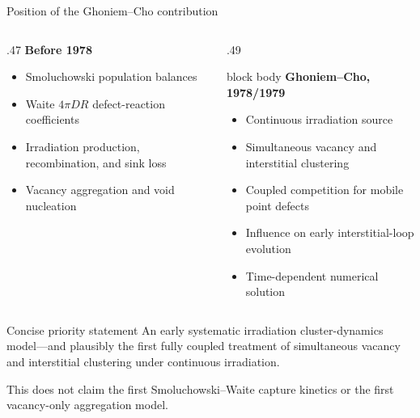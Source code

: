 \documentclass[aspectratio=169,11pt]{beamer}
\begin{document}
\begin{frame}{Position of the Ghoniem--Cho contribution}
\footnotesize
\begin{columns}[T,onlytextwidth]
\begin{column}{.47\textwidth}
\textbf{Before 1978}
\begin{itemize}
\setlength\itemsep{2pt}
\item Smoluchowski population balances
\item Waite $4\pi DR$ defect-reaction coefficients
\item Irradiation production, recombination, and sink loss
\item Vacancy aggregation and void nucleation
\end{itemize}
\end{column}
\begin{column}{.49\textwidth}
\begin{beamercolorbox}[sep=.2cm,rounded=true]{block body}
\textbf{Ghoniem--Cho, 1978/1979}
\begin{itemize}
\setlength\itemsep{2pt}
\item Continuous irradiation source
\item Simultaneous vacancy and interstitial clustering
\item Coupled competition for mobile point defects
\item Influence on early interstitial-loop evolution
\item Time-dependent numerical solution
\end{itemize}
\end{beamercolorbox}
\end{column}
\end{columns}
\vspace{0.08cm}
\begin{block}{Concise priority statement}
An early systematic irradiation cluster-dynamics model---and plausibly the first fully coupled treatment of simultaneous vacancy and interstitial clustering under continuous irradiation.
\end{block}
{\scriptsize\color{darkgray}This does not claim the first Smoluchowski--Waite capture kinetics or the first vacancy-only aggregation model.}
\end{frame}
\end{document}
